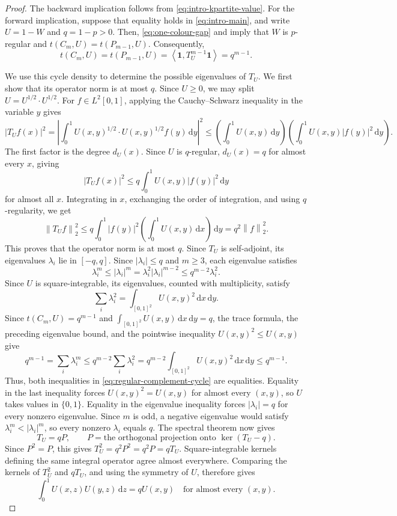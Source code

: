 \documentclass[11pt]{article}
\theoremstyle{remark}
\numberwithin{equation}{section}
\newcommand{\one}{\mathbf 1}
\newcommand{\ip}[2]{\left\langle #1,#2\right\rangle}
\newcommand{\norm}[1]{\left\lVert #1\right\rVert}
\newcommand{\dd}{\,\mathrm d}
\newcommand{\tC}[2]{t(C_{#1},#2)}
\newcommand{\tP}[2]{t(P_{#1},#2)}
\newcommand{\Tker}[1]{T_{#1}}
\newcommand{\intsq}{\int_{[0,1]^2}}
\newcommand{\ddxy}{\dd x\dd y}
\begin{document}
\begin{proof}
  The backward implication follows from \eqref{eq:intro-kpartite-value}.
  For the forward implication, suppose that equality holds in
  \eqref{eq:intro-main}, and write $U=1-W$ and $q=1-p>0$.
  Then, \eqref{eq:one-colour-gap} and  imply
  that $W$ is $p$-regular and $\tC mU=\tP{m-1}U$.
  Consequently,
  \[
    \tC mU=\tP{m-1}U
    =\ip\one{\Tker U^{m-1}\one}=q^{m-1}.
  \]

  We use this cycle density to determine the possible eigenvalues of
  $\Tker U$. We first show that its operator norm is at most $q$.
  Since $U\ge0$, we may split $U=U^{1/2}\cdot U^{1/2}$.
  For $f\in L^2[0,1]$, applying the Cauchy--Schwarz inequality in the
  variable $y$ gives
  \[
    \bigl|\Tker Uf(x)\bigr|^2
    =\left|\int_0^1 U(x,y)^{1/2}\cdot U(x,y)^{1/2}f(y)\dd y\right|^2
    \le\left(\int_0^1 U(x,y)\dd y\right)
      \left(\int_0^1 U(x,y)\bigl|f(y)\bigr|^2\dd y\right).
  \]
  The first factor is the degree $d_U(x)$. Since $U$ is $q$-regular,
  $d_U(x)=q$ for almost every $x$, giving
  \[
    \bigl|\Tker Uf(x)\bigr|^2\le q\int_0^1 U(x,y)\bigl|f(y)\bigr|^2\dd y
  \]
  for almost all $x$.
  Integrating in $x$, exchanging the order of integration, and using $q$-regularity, we get
  \[
    \norm{\Tker Uf}_2^2
    \le q\int_0^1\bigl|f(y)\bigr|^2
      \left(\int_0^1 U(x,y)\dd x\right)\dd y
    =q^2\norm f_2^2 .
  \]
  This proves that the operator norm is at most $q$. Since $\Tker U$ is self-adjoint,
  its eigenvalues $\lambda_i$ lie in $[-q,q]$.
  Since $|\lambda_i|\le q$ and $m\ge3$, each eigenvalue satisfies
  \[
    \lambda_i^m\le|\lambda_i|^m
    =\lambda_i^2|\lambda_i|^{m-2}
    \le q^{m-2}\lambda_i^2.
  \]
  Since $U$ is square-integrable, its eigenvalues, counted with
  multiplicity, satisfy
  \[
    \sum_i\lambda_i^2=\intsq U(x,y)^2\ddxy.
  \]
  Since $\tC mU=q^{m-1}$ and $\intsq U(x,y)\ddxy=q$,
  the trace formula, the preceding eigenvalue bound, and the pointwise
  inequality $U(x,y)^2\le U(x,y)$ give
  \begin{equation}\label{eq:regular-complement-cycle}
    q^{m-1}=\sum_i\lambda_i^m
    \le q^{m-2}\sum_i\lambda_i^2
    =q^{m-2}\intsq U(x,y)^2\ddxy
    \le q^{m-1}.
  \end{equation}
  Thus, both inequalities in \eqref{eq:regular-complement-cycle} are equalities. Equality in the last inequality forces
  $U(x,y)^2=U(x,y)$ for almost every $(x,y)$, so $U$ takes values in $\{0,1\}$.
  Equality in the eigenvalue inequality forces $|\lambda_i|=q$ for every
  nonzero eigenvalue. Since $m$ is odd, a negative eigenvalue would satisfy
  $\lambda_i^m<|\lambda_i|^m$, so every nonzero $\lambda_i$ equals $q$.
  The spectral theorem now gives
  \[
    \Tker U=qP,
    \qquad P=\text{the orthogonal projection onto }\ker(\Tker U-q).
  \]
  Since $P^2=P$, this gives $\Tker U^2=q^2P^2=q^2P=q\Tker U$.
  Square-integrable kernels defining the same integral operator agree
  almost everywhere. Comparing the kernels of $\Tker U^2$ and
  $q\Tker U$, and using the symmetry of $U$, therefore gives
  \begin{equation}\label{eq:equal-neighbourhoods}
    \int_0^1 U(x,z)U(y,z)\dd z=qU(x,y)
    \quad\text{for almost every }(x,y).
  \end{equation}


\end{proof}
\end{document}
